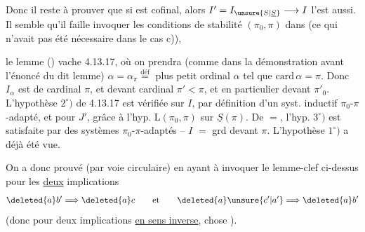 Donc il reste à prouver  que si
est cofinal, alors $I'=I_{\unsure{S|\underline S}}\longrightarrow I$ l'est aussi. Il semble qu'il faille    invoquer les conditions de stabilité  $(\pi_0,\pi)$  dans  (ce qui n'avait pas été nécessaire dans le cas c)), 



le lemme () vache 4.13.17, où on prendra (comme dans la démonstration  avant l'énoncé du dit lemme)
$\alpha=\alpha_\pi\overset{\text{déf}}{=}$ plus petit ordinal $\alpha$ tel que $\mathrm{card}\,\alpha=\pi$. Donc $I_\alpha$ est de cardinal $\pi$, et  devant  cardinal $\pi'<\pi$, et en particulier devant $\pi'_0$. L'hypothèse $2^\circ)$ de 4.13.17 est vérifiée sur $I$, par définition d'un syst. inductif $\pi_0$-$\pi$-adapté, et pour $J'$, grâce à l'hyp. $\mathrm L(\pi_0,\pi)$ sur $\underline S(\pi)$. De $=$, l'hyp. $3^\circ)$  est satisfaite par  des systèmes $\pi_0$-$\pi$-adaptés -- $I$  $=$ grd devant $\pi$. L'hypothèse $1^\circ)$ a déjà été vue.

On a donc prouvé (par voie circulaire)
en ayant à invoquer le lemme-clef ci-dessus pour les \uline{deux} implications
\[
 \deleted{a}b'\Longrightarrow\deleted{a}c\qquad\text{et}\qquad\deleted{a}\unsure{c'|a'}\Longrightarrow\deleted{a}b'
\]
(donc pour deux implications \uline{en sens inverse}, chose  \unsure{\ldots}).


